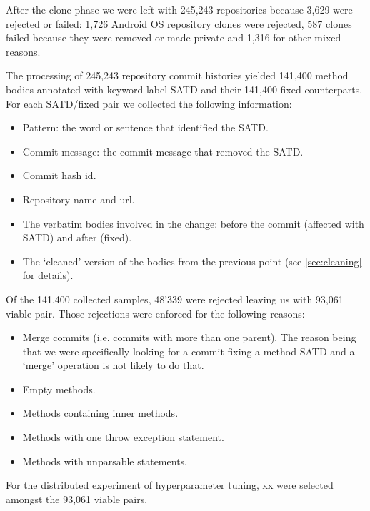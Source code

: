 After the clone phase we were left with 245,243 repositories because 3,629 were rejected or failed: 1,726 Android OS repository clones were rejected, 587 clones failed because they were removed or made private and 1,316 for other mixed reasons.

The processing of 245,243 repository commit histories yielded 141,400 method bodies annotated with keyword label SATD and their 141,400 fixed counterparts. For each SATD/fixed pair we collected the following information:
\begin{itemize}
    \item Pattern: the word or sentence that identified the SATD.
    \item Commit message: the commit message that removed the SATD.
    \item Commit hash id.
    \item Repository name and url.
    \item The verbatim bodies involved in the change: before the commit (affected with SATD) and after (fixed).
    \item The `cleaned' version of the bodies from the previous point (see \ref{sec:cleaning} for details).
\end{itemize}

Of the 141,400 collected samples, 48'339 were rejected leaving us with 93,061 viable pair. Those rejections were enforced for the following reasons:
\begin{itemize}
    \item Merge commits (i.e. commits with more than one parent). The reason being that we were specifically looking for a commit fixing a method SATD and a `merge' operation is not likely to do that.
    \item Empty methods.
    \item Methods containing inner methods.
    \item Methods with one throw exception statement.
    \item Methods with unparsable statements.
\end{itemize}

For the distributed experiment of hyperparameter tuning, xx were selected amongst the 93,061 viable pairs.
% 





